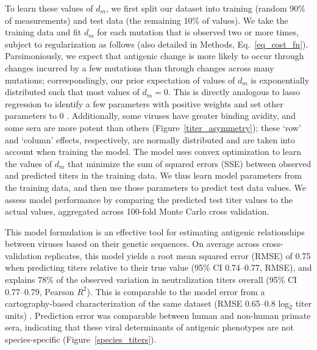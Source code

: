 \documentclass[11pt,oneside,letterpaper]{article}
\begin{document}
To learn these values of $d_m$, we first split our dataset into training (random 90\% of measurements) and test data (the remaining 10\% of values).
We take the training data and fit $d_m$ for each mutation that is observed two or more times, subject to regularization as follows (also detailed in Methods, Eq.~\ref{eq_cost_fn}).
Parsimoniously, we expect that antigenic change is more likely to occur through changes incurred by a few mutations than through changes across many mutations; correspondingly, our prior expectation of values of $d_m$ is exponentially distributed such that most values of $d_m = 0$.
This is directly analogous to lasso regression to identify a few parameters with positive weights and set other parameters to 0 \citep{tibshirani1996regression}.
Additionally, some viruses have greater binding avidity, and some sera are more potent than others (Figure~\ref{titer_asymmetry}); these `row' and `column' effects, respectively, are normally distributed and are taken into account when training the model.
The model uses convex optimization to learn the values of $d_m$ that minimize the sum of squared errors (SSE) between observed and predicted titers in the training data.
We thus learn model parameters from the training data, and then use those parameters to predict test data values.
We assess model performance by comparing the predicted test titer values to the actual values, aggregated across 100-fold Monte Carlo cross validation.

This model formulation is an effective tool for estimating antigenic relationships between viruses based on their genetic sequences.
On average across cross-validation replicates, this model yields a root mean squared error (RMSE) of 0.75 when predicting titers relative to their true value (95\% CI 0.74--0.77, RMSE), and explains 78\% of the observed variation in neutralization titers overall (95\% CI 0.77--0.79, Pearson $R^2$).
This is comparable to the model error from a cartography-based characterization of the same dataset (RMSE 0.65--0.8 log$_2$ titer units) \citep{katzelnick2015dengue}.
Prediction error was comparable between human and non-human primate sera, indicating that these viral determinants of antigenic phenotypes are not species-specific (Figure~\ref{species_titers}).
\end{document}
